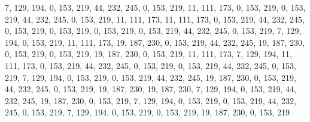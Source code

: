 7, 129, 194, 0, 153, 219, 44, 232, 245, 0, 153, 219, 11, 111, 173, 0,
153, 219, 0, 153, 219, 44, 232, 245, 0, 153, 219, 11, 111, 173, 11, 111,
173, 0, 153, 219, 44, 232, 245, 0, 153, 219, 0, 153, 219, 0, 153, 219,
0, 153, 219, 44, 232, 245, 0, 153, 219, 7, 129, 194, 0, 153, 219, 11,
111, 173, 19, 187, 230, 0, 153, 219, 44, 232, 245, 19, 187, 230, 0, 153,
219, 0, 153, 219, 19, 187, 230, 0, 153, 219, 11, 111, 173, 7, 129, 194,
11, 111, 173, 0, 153, 219, 44, 232, 245, 0, 153, 219, 0, 153, 219, 44,
232, 245, 0, 153, 219, 7, 129, 194, 0, 153, 219, 0, 153, 219, 44, 232,
245, 19, 187, 230, 0, 153, 219, 44, 232, 245, 0, 153, 219, 19, 187, 230,
19, 187, 230, 7, 129, 194, 0, 153, 219, 44, 232, 245, 19, 187, 230, 0,
153, 219, 7, 129, 194, 0, 153, 219, 0, 153, 219, 44, 232, 245, 0, 153,
219, 7, 129, 194, 0, 153, 219, 0, 153, 219, 19, 187, 230, 0, 153, 219
